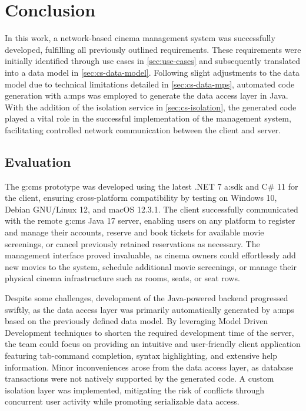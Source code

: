 \chapter{Conclusion}
\label{ch:conclusion}

In this work, a network-based cinema management system was successfully developed, fulfilling all previously outlined requirements. These requirements were initially identified through use cases in \cref{sec:use-cases} and subsequently translated into a data model in \cref{sec:cs-data-model}. Following slight adjustments to the data model due to technical limitations detailed in \cref{sec:cs-data-mps}, automated code generation with \gls{a:mps} was employed to generate the data access layer in Java. With the addition of the isolation service in \cref{sec:cs-isolation}, the generated code played a vital role in the successful implementation of the management system, facilitating controlled network communication between the client and server.

\section{Evaluation}
The \gls{g:cms} prototype was developed using the latest .NET 7 \gls{a:sdk} and C\# 11 for the client, ensuring cross-platform compatibility by testing on Windows 10, Debian GNU/Linux 12, and macOS 12.3.1. The client successfully communicated with the remote \gls{g:cms} Java 17 server, enabling users on any platform to register and manage their accounts, reserve and book tickets for available movie screenings, or cancel previously retained reservations as necessary. The management interface proved invaluable, as cinema owners could effortlessly add new movies to the system, schedule additional movie screenings, or manage their physical cinema infrastructure such as rooms, seats, or seat rows.

Despite some challenges, development of the Java-powered backend progressed swiftly, as the data access layer was primarily automatically generated by \gls{a:mps} based on the previously defined data model. By leveraging Model Driven Development techniques to shorten the required development time of the server, the team could focus on providing an intuitive and user-friendly client application featuring tab-command completion, syntax highlighting, and extensive help information. Minor inconveniences arose from the data access layer, as database transactions were not natively supported by the generated code. A custom isolation layer was implemented, mitigating the risk of conflicts through concurrent user activity while promoting serializable data access.

